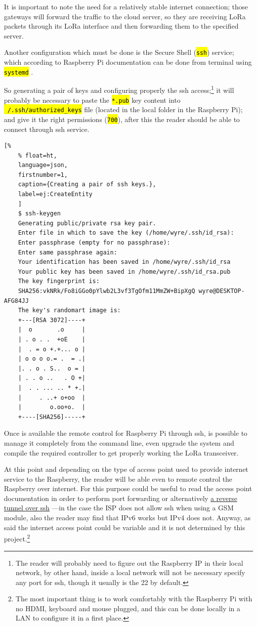 \documentclass[11pt,a4paper,dvipsnames,twoside]{article}
\newcommand{\cmd}[1] {\hl{\texttt{#1}}}
\begin{document}
It is important to note the need for a relatively stable internet connection; those gateways will forward the traffic to the cloud server, so they are receiving LoRa packets through its LoRa interface and then forwarding them to the specified server. 

Another configuration which must be done is the Secure Shell (\cmd{ssh}) service; which according to Raspberry Pi documentation can be done from terminal using \cmd{systemd} \cite{RaspiSSH}. 

So generating a pair of keys and configuring properly the ssh access;\footnote{The reader will probably need to figure out the Raspberry IP in their local network, by other hand, inside a local network will not be necessary specify any port for ssh, though it usually is the 22 by default.} it will probably be necessary to paste the \cmd{*.pub} key content into \cmd{~/.ssh/authorized\_keys} file (located in the local folder in the Raspberry Pi); and give it the right permissions (\cmd{700}), after this the reader should be able to connect through ssh service.

\begin{lstlisting}[%
    % float=ht,
    language=json,
    firstnumber=1,
    caption={Creating a pair of ssh keys.},
    label=ej:CreateEntity
    ]
    $ ssh-keygen
    Generating public/private rsa key pair.
    Enter file in which to save the key (/home/wyre/.ssh/id_rsa): 
    Enter passphrase (empty for no passphrase): 
    Enter same passphrase again: 
    Your identification has been saved in /home/wyre/.ssh/id_rsa
    Your public key has been saved in /home/wyre/.ssh/id_rsa.pub
    The key fingerprint is:
    SHA256:vkNRk/Fo8iGGo0pYlwb2L3vf3TgOfm11MmZW+BipXgQ wyre@DESKTOP-AFG84JJ
    The key's randomart image is:
    +---[RSA 3072]----+
    |  o       .o     |
    | . o . .  +oE    |
    |  . = o +.+... o |
    | o o o o.= .  = .|
    |. . o . S..  o = |
    | . . o ..   . O +|
    |  . . ... .. * +.|
    |     . ..+ o+oo  |
    |        o.oo+o.  |
    +----[SHA256]-----+
\end{lstlisting}

Once is available the remote control for Raspberry Pi through ssh, is possible to manage it completely from the command line, even upgrade the system and compile the required controller to get properly working the LoRa transceiver. 

At this point and depending on the type of access point used to provide internet service to the Raspberry, the reader will be able even to remote control the Raspberry over internet. For this purpose could be useful to read the access point documentation in order to perform port forwarding or alternatively \href{http://www.thirdway.ch/En/projects/raspberry_pi_3g/index.php}{a reverse tunnel over ssh} ---in the case the ISP does not allow ssh when using a GSM module, also the reader may find that IPv6 works but IPv4 does not. Anyway, as said the internet access point could be variable and it is not determined by this project.\footnote{The most important thing is to work comfortably with the Raspberry Pi with no HDMI, keyboard and mouse plugged, and this can be done locally in a LAN to configure it in a first place.}  
\end{document}
